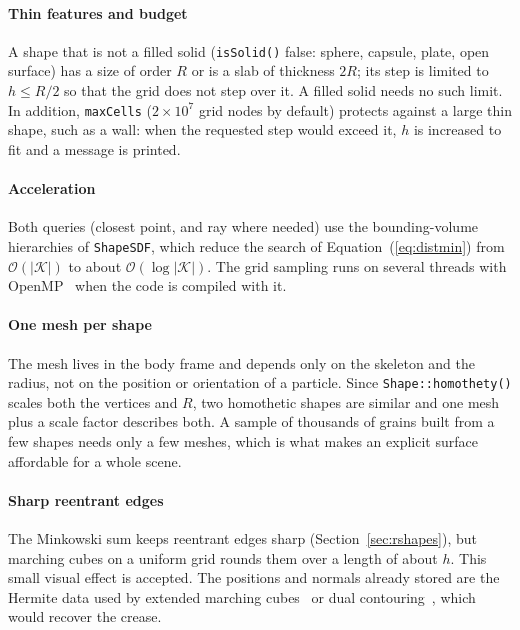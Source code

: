 \documentclass[11pt,a4paper]{article}
\newcommand{\Rmink}{R}                 %
\newcommand{\skel}{\mathcal{K}}        %
\newcommand{\code}[1]{\texttt{#1}}
\begin{document}
\paragraph{Thin features and budget} A shape that is not a filled solid
(\code{isSolid()} false: sphere, capsule, plate, open surface) has a size of order
$\Rmink$ or is a slab of thickness $2\Rmink$; its step is limited to
$h\le\Rmink/2$ so that the grid does not step over it. A filled solid needs no such
limit. In addition, \code{maxCells} ($2\times10^7$ grid nodes by default) protects
against a large thin shape, such as a wall: when the requested step would exceed
it, $h$ is increased to fit and a message is printed.

\paragraph{Acceleration} Both queries (closest point, and ray where needed) use the
bounding-volume hierarchies of \code{ShapeSDF}, which reduce the search of
Equation~(\ref{eq:distmin}) from $\mathcal{O}(|\skel|)$ to about
$\mathcal{O}(\log|\skel|)$. The grid sampling runs on several threads with
OpenMP~\cite{dagum1998} when the code is compiled with it.

\paragraph{One mesh per shape} The mesh lives in the body frame and depends only on
the skeleton and the radius, not on the position or orientation of a particle.
Since \code{Shape::homothety()} scales both the vertices and $\Rmink$, two
homothetic shapes are similar and one mesh plus a scale factor describes both. A
sample of thousands of grains built from a few shapes needs only a few meshes,
which is what makes an explicit surface affordable for a whole scene.

\paragraph{Sharp reentrant edges} The Minkowski sum keeps reentrant edges sharp
(Section~\ref{sec:rshapes}), but marching cubes on a uniform grid rounds them over
a length of about $h$. This small visual effect is accepted. The positions and
normals already stored are the Hermite data used by extended marching
cubes~\cite{kobbelt2001} or dual contouring~\cite{ju2002}, which would recover the
crease.

\end{document}

